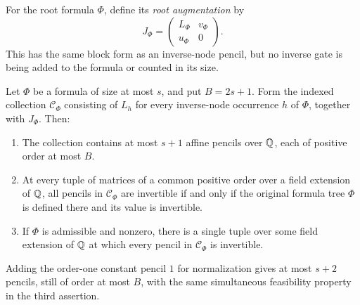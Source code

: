 For the root formula $\Phi$, define its \emph{root augmentation} by
\begin{equation}
 J_\Phi=
 \begin{pmatrix}L_\Phi&v_\Phi\\u_\Phi&0\end{pmatrix}.
 \label{eq:root-augmentation}
\end{equation}
This has the same block form as an inverse-node pencil, but no inverse
gate is being added to the formula or counted in its size.

\begin{proposition}
\label{prop:formula-certificates}
Let $\Phi$ be a formula of size at most $s$, and put $B=2s+1$.  Form the
indexed collection $\mathcal C_\Phi$ consisting of $L_h$ for every
inverse-node occurrence $h$ of $\Phi$, together with $J_\Phi$.
Then:
\begin{enumerate}
 \item The collection contains at most $s+1$ affine pencils over $\mathbb Q$,
       each of positive order at most $B$.
 \item At every tuple of matrices of a common positive order over a
       field extension of $\mathbb Q$, all pencils in $\mathcal C_\Phi$ are
       invertible if and only if the original formula tree $\Phi$ is
       defined there and its value is invertible.
 \item If $\Phi$ is admissible and nonzero, there is a single tuple over
       some field extension of $\mathbb Q$ at which every pencil in
       $\mathcal C_\Phi$ is invertible.
\end{enumerate}
Adding the order-one constant pencil $1$ for normalization gives at
most $s+2$ pencils, still of order at most $B$, with the same simultaneous
feasibility property in the third assertion.
\end{proposition}

